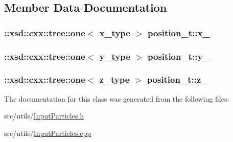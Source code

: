 \subsection{Member Data Documentation}
\hypertarget{classposition__t_a60250d37007dbfaa7fa16ab2c1917db7}{
\subsubsection[{x\-\_\-}]{\setlength{\rightskip}{0pt plus 5cm}\-::xsd\-::cxx\-::tree\-::one$<$ {\bf x\-\_\-type} $>$ position\-\_\-t\-::x\-\_\-\hspace{0.3cm}{\ttfamily [protected]}}}\label{classposition__t_a60250d37007dbfaa7fa16ab2c1917db7}
\hypertarget{classposition__t_aa907630b4c4487935e5f4f3a10835300}{
\subsubsection[{y\-\_\-}]{\setlength{\rightskip}{0pt plus 5cm}\-::xsd\-::cxx\-::tree\-::one$<$ {\bf y\-\_\-type} $>$ position\-\_\-t\-::y\-\_\-\hspace{0.3cm}{\ttfamily [protected]}}}\label{classposition__t_aa907630b4c4487935e5f4f3a10835300}
\hypertarget{classposition__t_af239aae25aff69d6f8934a737d4e4152}{
\subsubsection[{z\-\_\-}]{\setlength{\rightskip}{0pt plus 5cm}\-::xsd\-::cxx\-::tree\-::one$<$ {\bf z\-\_\-type} $>$ position\-\_\-t\-::z\-\_\-\hspace{0.3cm}{\ttfamily [protected]}}}\label{classposition__t_af239aae25aff69d6f8934a737d4e4152}


The documentation for this class was generated from the following files\-:\begin{DoxyCompactItemize}
\item 
src/utils/\hyperlink{InputParticles_8h}{Input\-Particles.\-h}\item 
src/utils/\hyperlink{InputParticles_8cpp}{Input\-Particles.\-cpp}\end{DoxyCompactItemize}
